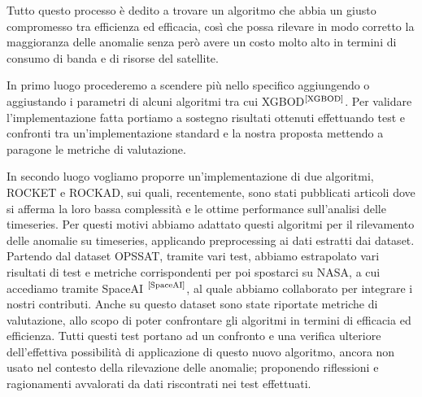 Tutto questo processo è dedito a trovare un algoritmo che abbia un giusto compromesso tra efficienza ed efficacia, così che possa rilevare in modo corretto la maggioranza delle anomalie senza però avere un costo molto alto in termini di consumo di banda e di risorse del satellite.

In primo luogo procederemo a scendere più nello specifico aggiungendo o aggiustando i parametri di alcuni algoritmi tra cui XGBOD$^{\text{\cite{XGBOD}}}$.
Per validare l'implementazione fatta portiamo a sostegno risultati ottenuti effettuando test e confronti tra un'implementazione standard e la nostra proposta mettendo a paragone le metriche di valutazione.

In secondo luogo vogliamo proporre un'implementazione di due algoritmi, ROCKET e ROCKAD, sui quali, recentemente, sono stati pubblicati articoli dove si afferma la loro bassa complessità e le ottime performance sull'analisi delle timeseries.
Per questi motivi abbiamo adattato questi algoritmi per il rilevamento delle anomalie su timeseries, applicando preprocessing ai dati estratti dai dataset. Partendo dal dataset OPS\textunderscore SAT, tramite vari test, abbiamo estrapolato vari risultati di test e metriche corrispondenti per poi spostarci su NASA, a cui accediamo tramite SpaceAI $^{\text{\cite{SpaceAI}}}$, al quale abbiamo collaborato per integrare i nostri contributi. Anche su questo dataset sono state riportate metriche di valutazione, allo scopo di poter confrontare gli algoritmi in termini di efficacia ed efficienza.
Tutti questi test portano ad un confronto e una verifica ulteriore dell'effettiva possibilità di applicazione di questo nuovo algoritmo, ancora non usato nel contesto della rilevazione delle anomalie; proponendo riflessioni e ragionamenti avvalorati da dati riscontrati nei test effettuati.

